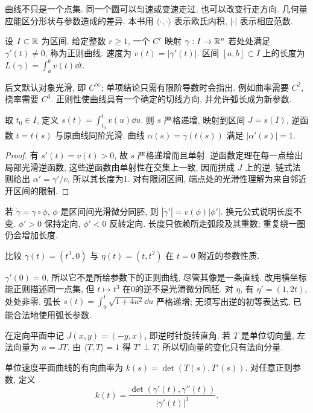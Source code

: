 曲线不只是一个点集. 同一个圆可以匀速或变速走过, 也可以改变行走方向. 几何量应能区分形状与参数造成的差异. 本书用 $\langle\cdot,\cdot\rangle$ 表示欧氏内积, $|\cdot|$ 表示相应范数.
\begin{definition}
设 $I\subset\mathbb R$ 为区间. 给定整数 $r\ge1$, 一个 $C^r$ 映射 $\gamma:I\to\mathbb R^n$ 若处处满足 $\gamma'(t)\ne0$, 称为正则曲线. 速度为 $v(t)=|\gamma'(t)|$. 区间 $[a,b]\subset I$ 上的长度为 $L(\gamma)=\int_a^b v(t)\dd t$.
\end{definition}
后文默认对象光滑, 即 $C^\infty$; 单项结论只需有限阶导数时会指出. 例如曲率需要 $C^2$, 挠率需要 $C^3$. 正则性使曲线具有一个确定的切线方向, 并允许弧长成为新参数.
\begin{proposition}\label{prop:arclength}
取 $t_0\in I$, 定义 $s(t)=\int_{t_0}^t v(u)\dd u$. 则 $s$ 严格递增, 映射到区间 $J=s(I)$, 逆函数 $t=t(s)$ 与原曲线同阶光滑. 曲线 $\alpha(s)=\gamma(t(s))$ 满足 $|\alpha'(s)|=1$.
\end{proposition}
\begin{proof}
有 $s'(t)=v(t)>0$, 故 $s$ 严格递增而且单射. 逆函数定理在每一点给出局部光滑逆函数, 这些逆函数由单射性在交集上一致, 因而拼成 $J$ 上的逆. 链式法则给出 $\alpha'=\gamma'/v$, 所以其长度为1. 对有限闭区间, 端点处的光滑性理解为来自邻近开区间的限制.
\end{proof}
若 $\widetilde\gamma=\gamma\circ\phi$, $\phi$ 是区间间光滑微分同胚, 则 $|\widetilde\gamma'|=v(\phi)|\phi'|$. 换元公式说明长度不变. $\phi'>0$ 保持定向, $\phi'<0$ 反转定向. 长度只依赖所走弧段及其重数; 重复绕一圈仍会增加长度.
\begin{example}
比较 $\gamma(t)=(t^3,0)$ 与 $\eta(t)=(t,t^2)$ 在 $t=0$ 附近的参数性质.
\end{example}
\begin{solution}
$\gamma'(0)=0$, 所以它不是所给参数下的正则曲线, 尽管其像是一条直线. 改用横坐标能正则描述同一点集, 但 $t\mapsto t^3$ 在0的逆不是光滑微分同胚. 对 $\eta$, 有 $\eta'=(1,2t)$, 处处非零. 弧长 $s(t)=\int_0^t\sqrt{1+4u^2}\dd u$ 严格递增; 无须写出逆的初等表达式, 已能合法地使用弧长参数.
\end{solution}
在定向平面中记 $J(x,y)=(-y,x)$, 即逆时针旋转直角. 若 $T$ 是单位切向量, 左法向量为 $n=JT$. 由 $\langle T,T\rangle=1$ 得 $T'\perp T$, 所以切向量的变化只有法向分量.
\begin{definition}
单位速度平面曲线的有向曲率为 $k(s)=\det(T(s),T'(s))$. 对任意正则参数, 定义
\begin{equation}\label{eq:plane-curvature}
k(t)=\frac{\det(\gamma'(t),\gamma''(t))}{|\gamma'(t)|^3}.
\end{equation}
\end{definition}
